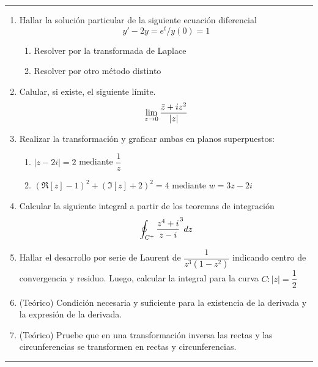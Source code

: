 \documentclass[9pt,a4paper]{extarticle}
\newcommand{\plus}{\scalebox{0.6}{$+$}}
\begin{document}
\hrule
{}
\begin{enumerate}


    \item Hallar la solución particular de la siguiente ecuación diferencial $$y' -2y=e^t / y(0)=1$$
    \begin{enumerate}
        \item Resolver por la transformada de Laplace
        \item Resolver por otro método distinto
    \end{enumerate}
    
    \item Calular, si existe, el siguiente límite. $$\lim_{z \to 0} \dfrac{\Bar{z}+iz^2}{|z|}$$
    
    \item Realizar la transformación y graficar ambas en planos superpuestos:
    \begin{enumerate}
        \item $|z-2i|=2$ mediante $\dfrac{1}{z}$
        \item $(\Re[z]-1)^2 +(\Im[z]+2)^2 = 4$ mediante $w=3z-2i$
    \end{enumerate}
    
    \item Calcular la siguiente integral a partir de los teoremas de integración
    $$\oint_{C^{\plus}} \dfrac{z^4+i}{z-i}^3 dz$$
    
    \item Hallar el desarrollo por serie de Laurent de $\dfrac{1}{z^3 (1-z^2)}$ indicando centro de convergencia y residuo. Luego, calcular la integral para la curva $C: |z|=\dfrac{1}{2}$

    
    \item  (Teórico) Condición necesaria y suficiente para la existencia de la derivada y la expresión de la derivada.
    \item (Teórico) Pruebe que en una transformación inversa las rectas y las circunferencias se transformen en rectas y circunferencias.
\end{enumerate}
\hrule
\end{document}
